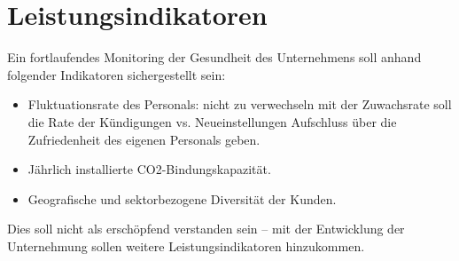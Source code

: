 \section{Leistungsindikatoren}

Ein fortlaufendes Monitoring der Gesundheit des Unternehmens soll anhand folgender Indikatoren sichergestellt sein:

\begin{itemize}
    \item Fluktuationsrate des Personals: nicht zu verwechseln mit der Zuwachsrate soll die Rate der Kündigungen vs. Neueinstellungen Aufschluss über die Zufriedenheit des eigenen Personals geben.
    \item Jährlich installierte CO2-Bindungskapazität.
    \item Geografische und sektorbezogene Diversität der Kunden.
\end{itemize}

Dies soll nicht als erschöpfend verstanden sein -- mit der Entwicklung der Unternehmung sollen weitere Leistungsindikatoren hinzukommen.